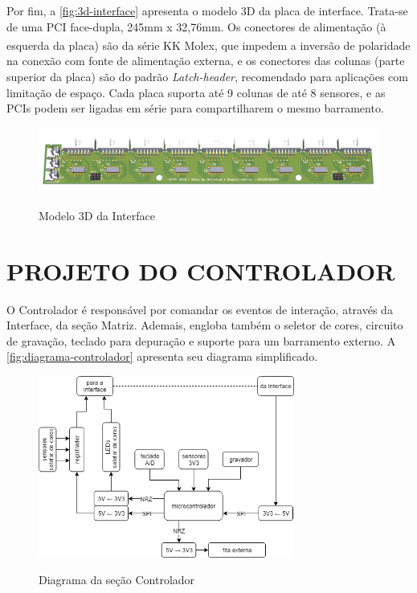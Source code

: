 Por fim, a \autoref{fig:3d-interface} apresenta o modelo 3D da placa de interface. Trata-se de uma PCI face-dupla, 245mm x 32,76mm. Os conectores de alimentação (à esquerda da placa) são da série KK Molex\textsuperscript{\textregistered}, que impedem a inversão de polaridade na conexão com fonte de alimentação externa, e os conectores das colunas (parte superior da placa) são do padrão \emph{Latch-header}, recomendado para aplicações com limitação de espaço. Cada placa suporta até 9 colunas de até 8 sensores, e as PCIs podem ser ligadas em série para compartilharem o mesmo barramento.

\begin{figure}[H]
    \centering
    \caption{Modelo 3D da Interface}
    \includegraphics[width=1.0\textwidth]{./dados/figuras/interface-3d}
    \label{fig:3d-interface}
\end{figure}

\section{PROJETO DO CONTROLADOR}
\label{sec:controlador}

O Controlador é responsável por comandar os eventos de interação, através da Interface, da seção Matriz. Ademais, engloba também o seletor de cores, circuito de gravação, teclado para depuração e suporte para um barramento externo. A \autoref{fig:diagrama-controlador} apresenta seu diagrama simplificado.

\begin{figure}[H]
    \centering
    \caption{Diagrama da seção Controlador}
    \includegraphics[width=0.75\textwidth]{./dados/figuras/diagrama-controlador}
    \label{fig:diagrama-controlador}
\end{figure}

